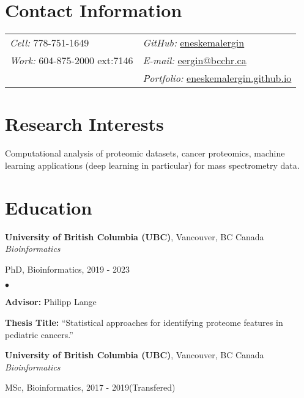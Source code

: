 \documentclass[margin,line]{res}
\newenvironment{list1}{
  \begin{list}{\ding{113}}{%
      \setlength{\itemsep}{0in}
      \setlength{\parsep}{0in} \setlength{\parskip}{0in}
      \setlength{\topsep}{0in} \setlength{\partopsep}{0in}
      \setlength{\leftmargin}{0.17in}}}{\end{list}}
\newenvironment{list2}{
  \begin{list}{$\bullet$}{%
      \setlength{\itemsep}{0in}
      \setlength{\parsep}{0in} \setlength{\parskip}{0in}
      \setlength{\topsep}{0in} \setlength{\partopsep}{0in}
      \setlength{\leftmargin}{0.2in}}}{\end{list}}
\begin{document}

\begin{resume}
\section{\sc Contact Information}
\vspace{.05in}
\begin{tabular}{@{}p{2in}p{4in}}
{\it Cell:} 778-751-1649               & \hfill {\it GitHub:}  \href{https://github.com/eneskemalergin}{eneskemalergin} \\
{\it Work:} 604-875-2000 ext:7146    & \hfill {\it E-mail:}  \href{mailto:eergin@bcchr.ca}{eergin@bcchr.ca}\\
        & \hfill {\it Portfolio:}  \href{eneskemalergin.github.io}{eneskemalergin.github.io} \\
\end{tabular}


\section{\sc Research Interests}
Computational analysis of proteomic datasets, cancer proteomics, machine learning applications (deep learning in particular) for mass spectrometry data.

\section{\sc Education}

{\bf University of British Columbia (UBC)}, Vancouver, BC Canada\\
{\em Bioinformatics}
\begin{list1}
\item[]  PhD, Bioinformatics, 2019 - 2023
\begin{list2}
\vspace*{.05in}
\item {\bf Advisor:}  Philipp Lange
\item {\bf Thesis Title:}  ``Statistical approaches for identifying proteome features in pediatric cancers.''
\end{list2}
\end{list1}

{\bf University of British Columbia (UBC)}, Vancouver, BC Canada\\
{\em Bioinformatics}
\begin{list1}
\item[]  MSc, Bioinformatics, 2017 - 2019(Transfered)
\end{list1}


\end{resume}
\end{document}
